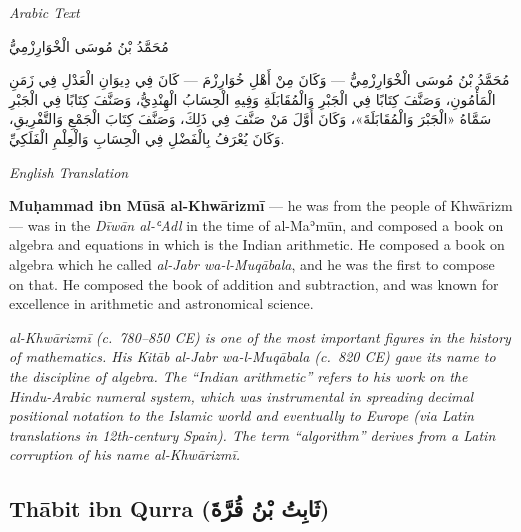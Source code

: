 \documentclass[11pt,a4paper]{article}
\def\RL#1{\beginR#1\endR}
\newcommand{\cnote}[1]{\textcolor{notecolor}{\textit{#1}}}
\newcommand{\textarabic}[1]{{\arabicfont\RL{#1}}}
\newenvironment{arabiccol}{%
  \begin{minipage}[t]{0.48\textwidth}%
  \begin{tcolorbox}[colback=leftbg,colframe=rulecolor,boxrule=0.4pt,arc=2pt,left=5pt,right=5pt,top=5pt,bottom=5pt]%
  \centering\textit{\footnotesize Arabic Text}\\[0.4em]%
  \raggedright\arabicfont\small%
}{%
  \end{tcolorbox}%
  \end{minipage}%
}
\newenvironment{englishcol}{%
  \begin{minipage}[t]{0.48\textwidth}%
  \begin{tcolorbox}[colback=rightbg,colframe=rulecolor,boxrule=0.4pt,arc=2pt,left=5pt,right=5pt,top=5pt,bottom=5pt]%
  \centering\textit{\footnotesize English Translation}\\[0.4em]%
  \raggedright\small%
}{%
  \end{tcolorbox}%
  \end{minipage}%
}
\begin{document}
\noindent
\begin{arabiccol}
\beginR
مُحَمَّدُ بْنُ مُوسَى الْخْوَارِزْمِيُّ

مُحَمَّدُ بْنُ مُوسَى الْخْوَارِزْمِيُّ — وَكَانَ مِنْ أَهْلِ خُوَارِزْمَ — كَانَ فِي دِيوَانِ الْعَدْلِ فِي زَمَنِ الْمَأْمُونِ، وَصَنَّفَ كِتَابًا فِي الْجَبْرِ وَالْمُقَابَلَةِ وَفِيهِ الْحِسَابُ الْهِنْدِيُّ، وَصَنَّفَ كِتَابًا فِي الْجَبْرِ سَمَّاهُ «الْجَبْرَ وَالْمُقَابَلَةَ»، وَكَانَ أَوَّلَ مَنْ صَنَّفَ فِي ذَلِكَ، وَصَنَّفَ كِتَابَ الْجَمْعِ وَالتَّفْرِيقِ، وَكَانَ يُعْرَفُ بِالْفَضْلِ فِي الْحِسَابِ وَالْعِلْمِ الْفَلَكِيِّ.
\endR
\end{arabiccol}
\hfill
\begin{englishcol}
\textbf{Muḥammad ibn Mūsā al-Khwārizmī} --- he was from the people of Khwārizm --- was in the \textit{Dīwān al-ʿAdl} in the time of al-Maʾmūn, and composed a book on algebra and equations in which is the Indian arithmetic. He composed a book on algebra which he called \textit{al-Jabr wa-l-Muqābala}, and he was the first to compose on that. He composed the book of addition and subtraction, and was known for excellence in arithmetic and astronomical science.

\cnote{al-Khwārizmī (c.~780--850 CE) is one of the most important figures in the history of mathematics. His \textit{Kitāb al-Jabr wa-l-Muqābala} (c.~820 CE) gave its name to the discipline of algebra. The ``Indian arithmetic'' refers to his work on the Hindu-Arabic numeral system, which was instrumental in spreading decimal positional notation to the Islamic world and eventually to Europe (via Latin translations in 12th-century Spain). The term ``algorithm'' derives from a Latin corruption of his name \textit{al-Khwārizmī}.}
\end{englishcol}

\par\vspace{0.5em}

\subsection{Thābit ibn Qurra (\textarabic{ثَابِتُ بْنُ قُرَّةَ})}
\end{document}

